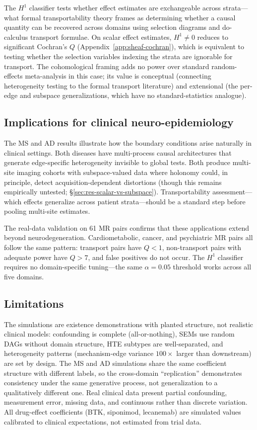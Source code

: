\documentclass{article}
\begin{document}
The $H^1$ classifier tests whether effect estimates are exchangeable across strata---what formal transportability theory frames as determining whether a causal quantity can be recovered across domains using selection diagrams and do-calculus transport formulae.
On scalar effect estimates, $H^1 \neq 0$ reduces to significant Cochran's $Q$ (Appendix~\ref{app:sheaf-cochran}), which is equivalent to testing whether the selection variables indexing the strata are ignorable for transport.
The cohomological framing adds no power over standard random-effects meta-analysis in this case; its value is conceptual (connecting heterogeneity testing to the formal transport literature) and extensional (the per-edge and subspace generalizations, which have no standard-statistics analogue).

\subsection{Implications for clinical neuro-epidemiology}

The MS and AD results illustrate how the boundary conditions arise naturally in clinical settings.
Both diseases have multi-process causal architectures that generate edge-specific heterogeneity invisible to global tests.
Both produce multi-site imaging cohorts with subspace-valued data where holonomy could, in principle, detect acquisition-dependent distortions (though this remains empirically untested; \S\ref{sec:res-scalar-vs-subspace}).
Transportability assessment---which effects generalize across patient strata---should be a standard step before pooling multi-site estimates.

The real-data validation on 61 MR pairs confirms that these applications extend beyond neurodegeneration.
Cardiometabolic, cancer, and psychiatric MR pairs all follow the same pattern: transport pairs have $Q < 1$, non-transport pairs with adequate power have $Q > 7$, and false positives do not occur. The $H^1$ classifier requires no domain-specific tuning---the same $\alpha = 0.05$ threshold works across all five domains.

\subsection{Limitations}

The simulations are existence demonstrations with planted structure, not realistic clinical models: confounding is complete (all-or-nothing), SEMs use random DAGs without domain structure, HTE subtypes are well-separated, and heterogeneity patterns (mechanism-edge variance $100\times$ larger than downstream) are set by design.
The MS and AD simulations share the same coefficient structure with different labels, so the cross-domain ``replication'' demonstrates consistency under the same generative process, not generalization to a qualitatively different one.
Real clinical data present partial confounding, measurement error, missing data, and continuous rather than discrete variation.
All drug-effect coefficients (BTK, siponimod, lecanemab) are simulated values calibrated to clinical expectations, not estimated from trial data.
\end{document}
